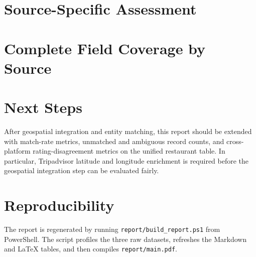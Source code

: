 \documentclass[11pt,a4paper]{article}
\begin{document}
\section{Source-Specific Assessment}







\section{Complete Field Coverage by Source}







\section{Next Steps}

After geospatial integration and entity matching, this report should be extended
with match-rate metrics, unmatched and ambiguous record counts, and
cross-platform rating-disagreement metrics on the unified restaurant table. In
particular, Tripadvisor latitude and longitude enrichment is required before the
geospatial integration step can be evaluated fairly.

\section{Reproducibility}

The report is regenerated by running \texttt{report/build\_report.ps1} from
PowerShell. The script profiles the three raw datasets, refreshes the Markdown
and LaTeX tables, and then compiles \texttt{report/main.pdf}.
\end{document}
